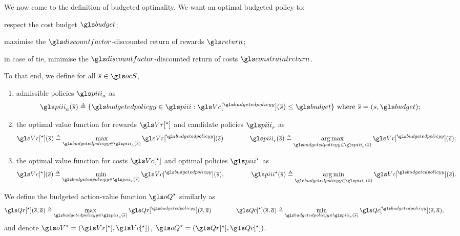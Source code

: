We now come to the definition of budgeted optimality. We want an optimal budgeted policy to: 
\begin{enumerate*}[label=(\roman*)]
	\item respect the cost budget $\budget$;
	\item maximise the $\discount$-discounted return of rewards $\return$;
	\item in case of tie, minimise the $\discount$-discounted return of costs $\constraintreturn$.
\end{enumerate*}

\begin{definition}
	\begin{leftbar}[defnbar]
	To that end, we define for all $\os\in\ocS$,
	\begin{enumerate}[label=(\roman*)]
		\item admissible policies $\policies_a$ as
		\begin{equation}
		\policies_a(\os) \eqdef \{\budgetedpolicy\in\policies: \Vc[^\budgetedpolicy](\os) \leq \budget\}\text{ where }\os = (s, \budget);
		\end{equation}
		\item the optimal value function for rewards $\Vr[^\star]$ and candidate policies $\policies_r$ as
		\begin{equation}
		\Vr[^\star](\os) \eqdef \max_{\budgetedpolicy\in\policies_a(\os)}  \Vr[^\budgetedpolicy](\os) \qquad\qquad \policies_r(\os) \eqdef \argmax_{\budgetedpolicy\in\policies_a(\os)}  \Vr[^\budgetedpolicy](\os);
		\end{equation}
		\item the optimal value function for costs $\Vc[^\star]$ and optimal policies $\policies^\star$ as
		\begin{equation}
		\Vc[^\star](\os) \eqdef \min_{\budgetedpolicy\in\policies_r(\os)}  \Vc[^\budgetedpolicy](\os), \qquad\qquad \policies^{\star}(\os) \eqdef \argmin_{\budgetedpolicy\in\policies_r(\os)}  \Vc[^\budgetedpolicy](\os).
		\end{equation}
	\end{enumerate}
	We define the budgeted action-value function $\oQ^{\star}$ similarly as
	\begin{equation}
	\Qr[^\star](\os, \oa) \eqdef \max_{\budgetedpolicy\in\policies_a(\os)}  \Qr[^\budgetedpolicy](\os, \oa) \qquad\qquad \Qc[^\star](\os, \oa) \eqdef \min_{\budgetedpolicy\in\policies_r(\os)}  \Qc[^\budgetedpolicy](\os, \oa),
	\end{equation}
	and denote $\oV^{\star} = (\Vr[^\star], \Vc[^\star])$, $\oQ^{\star} = (\Qr[^\star], \Qc[^\star])$.
	\end{leftbar}
\end{definition}


